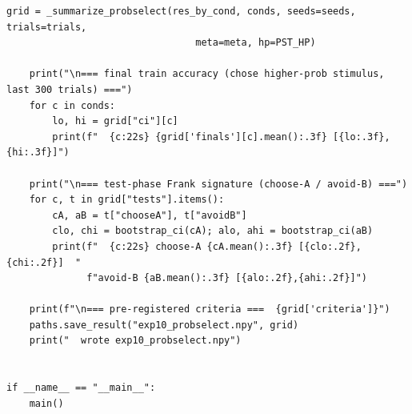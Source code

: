 \begin{lstlisting}[caption={mrl\_trace/probselect.py},label={lst:siox-src-probselect}]
    grid = _summarize_probselect(res_by_cond, conds, seeds=seeds, trials=trials,
                                 meta=meta, hp=PST_HP)

    print("\n=== final train accuracy (chose higher-prob stimulus, last 300 trials) ===")
    for c in conds:
        lo, hi = grid["ci"][c]
        print(f"  {c:22s} {grid['finals'][c].mean():.3f} [{lo:.3f}, {hi:.3f}]")

    print("\n=== test-phase Frank signature (choose-A / avoid-B) ===")
    for c, t in grid["tests"].items():
        cA, aB = t["chooseA"], t["avoidB"]
        clo, chi = bootstrap_ci(cA); alo, ahi = bootstrap_ci(aB)
        print(f"  {c:22s} choose-A {cA.mean():.3f} [{clo:.2f},{chi:.2f}]  "
              f"avoid-B {aB.mean():.3f} [{alo:.2f},{ahi:.2f}]")

    print(f"\n=== pre-registered criteria ===  {grid['criteria']}")
    paths.save_result("exp10_probselect.npy", grid)
    print("  wrote exp10_probselect.npy")


if __name__ == "__main__":
    main()
\end{lstlisting}

